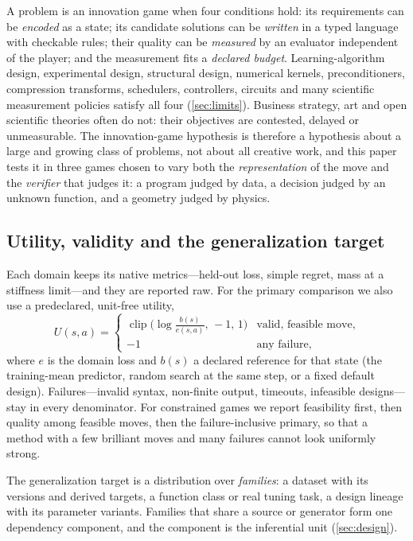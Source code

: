 A problem is an innovation game when four conditions hold: its requirements can be \emph{encoded} as a
state; its candidate solutions can be \emph{written} in a typed language with checkable rules; their
quality can be \emph{measured} by an evaluator independent of the player; and the measurement fits a
\emph{declared budget}. Learning-algorithm design, experimental design, structural design, numerical
kernels, preconditioners, compression transforms, schedulers, controllers, circuits and many
scientific measurement policies satisfy all four (\cref{sec:limits}). Business strategy, art and open
scientific theories often do not: their objectives are contested, delayed or unmeasurable. The
innovation-game hypothesis is therefore a hypothesis about a large and growing class of problems, not
about all creative work, and this paper tests it in three games chosen to vary both the
\emph{representation} of the move and the \emph{verifier} that judges it: a program judged by data, a
decision judged by an unknown function, and a geometry judged by physics.

\subsection{Utility, validity and the generalization target}

Each domain keeps its native metrics---held-out loss, simple regret, mass at a stiffness limit---and
they are reported raw. For the primary comparison we also use a predeclared, unit-free utility,
\begin{equation}
U(s,a)=\begin{cases}\operatorname{clip}\bigl(\log\tfrac{b(s)}{e(s,a)},\,-1,\,1\bigr) & \text{valid, feasible move},\\
-1 & \text{any failure},\end{cases}
\label{eq:utility}
\end{equation}
where $e$ is the domain loss and $b(s)$ a declared reference for that state (the training-mean
predictor, random search at the same step, or a fixed default design). Failures---invalid syntax,
non-finite output, timeouts, infeasible designs---stay in every denominator. For constrained games we
report feasibility first, then quality among feasible moves, then the failure-inclusive primary, so
that a method with a few brilliant moves and many failures cannot look uniformly strong.

The generalization target is a distribution over \emph{families}: a dataset with its versions and
derived targets, a function class or real tuning task, a design lineage with its parameter variants.
Families that share a source or generator form one dependency component, and the component is the
inferential unit (\cref{sec:design}).

